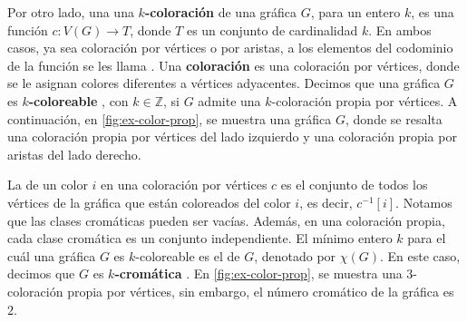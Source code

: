 Por otro lado, una una \textbf{$k$-coloraci\'on}
 de
una gr\'afica $G$, para un entero $k$, es una funci\'on $c \colon V(G)\to T$,
donde $T$ es un conjunto de cardinalidad $k$. En ambos casos, ya sea
coloraci\'on por v\'ertices o por aristas, a los elementos del codominio de la
funci\'on se les llama . Una \textbf{coloraci\'on}
 es una coloraci\'on por
v\'ertices, donde se le asignan colores diferentes a v\'ertices
adyacentes. Decimos que una gr\'afica $G$ es $k$\textbf{-coloreable}
, con $k \in \mathbb{Z}$, si $G$ admite
una $k$-coloraci\'on propia por v\'ertices. A continuaci\'on, en
\cref{fig:ex-color-prop}, se muestra una gr\'afica $G$, donde se resalta una
coloraci\'on propia por v\'ertices del lado izquierdo y una coloraci\'on propia
por aristas del lado derecho. 

La  de un color $i$ en una coloraci\'on por v\'ertices
$c$ es el conjunto de todos los v\'ertices de la gr\'afica que est\'an
coloreados del color $i$, es decir, $c^{-1}[i]$. Notamos que las clases
crom\'aticas pueden ser vac\'ias. Adem\'as, en una coloraci\'on propia, cada
clase crom\'atica es un conjunto independiente. El m\'inimo entero $k$ para el
cu\'al una gr\'afica $G$ es $k$-coloreable es el 
de $G$, denotado por $\chi(G)$. En este caso, decimos que $G$ es
$k$\textbf{-crom\'atica} . En
\cref{fig:ex-color-prop}, se muestra una $3$-coloraci\'on propia por v\'ertices,
sin embargo, el n\'umero crom\'atico de la gr\'afica es $2$. 


